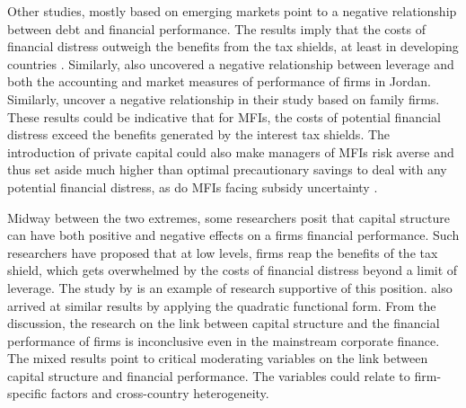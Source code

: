\documentclass[a4paper,nobind]{templates/ociamthesis}
\begin{document}
Other studies, mostly based on emerging markets point to a negative relationship between debt and financial performance. The results imply that the costs of financial distress outweigh the benefits from the tax shields, at least in developing countries \autocite{le2017capital}. Similarly, \textcite{zeitun2014capital} also uncovered a negative relationship between leverage and both the accounting and market measures of performance of firms in Jordan. Similarly, \textcite{hamid2015capital} uncover a negative relationship in their study based on family firms. These results could be indicative that for MFIs, the costs of potential financial distress exceed the benefits generated by the interest tax shields. The introduction of private capital could also make managers of MFIs risk averse and thus set aside much higher than optimal precautionary savings to deal with any potential financial distress, as do MFIs facing subsidy uncertainty \autocite{armendariz2013subsidy}.

Midway between the two extremes, some researchers posit that capital structure can have both positive and negative effects on a firms financial performance. Such researchers have proposed that at low levels, firms reap the benefits of the tax shield, which gets overwhelmed by the costs of financial distress beyond a limit of leverage. The study by \textcite{lin2011does} is an example of research supportive of this position. \textcite{margaritis2007capital} also arrived at similar results by applying the quadratic functional form. From the discussion, the research on the link between capital structure and the financial performance of firms is inconclusive even in the mainstream corporate finance. The mixed results point to critical moderating variables on the link between capital structure and financial performance. The variables could relate to firm-specific factors and cross-country heterogeneity.
\end{document}
